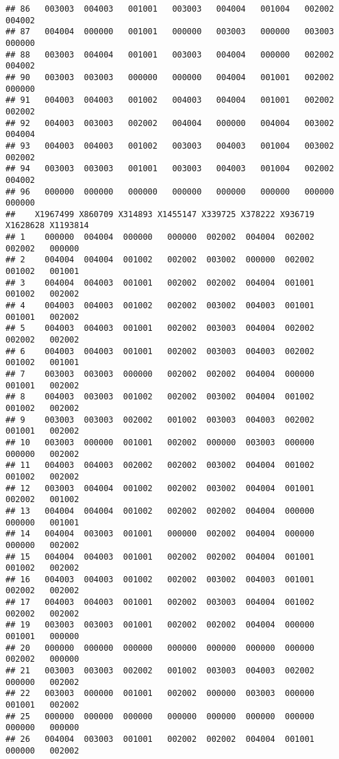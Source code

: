 \documentclass[
]{article}
\begin{document}
\begin{verbatim}
## 86   003003  004003   001001   003003   004004   001004   002002   004002
## 87   004004  000000   001001   000000   003003   000000   003003   000000
## 88   003003  004004   001001   003003   004004   000000   002002   004002
## 90   003003  003003   000000   000000   004004   001001   002002   000000
## 91   004003  004003   001002   004003   004004   001001   002002   002002
## 92   004003  003003   002002   004004   000000   004004   003002   004004
## 93   004003  004003   001002   003003   004003   001004   003002   002002
## 94   003003  003003   001001   003003   004003   001004   002002   004002
## 96   000000  000000   000000   000000   000000   000000   000000   000000
##    X1967499 X860709 X314893 X1455147 X339725 X378222 X936719 X1628628 X1193814
## 1    000000  004004  000000   000000  002002  004004  002002   002002   000000
## 2    004004  004004  001002   002002  003002  000000  002002   001002   001001
## 3    004004  004003  001001   002002  002002  004004  001001   001002   002002
## 4    004003  004003  001002   002002  003002  004003  001001   001001   002002
## 5    004003  004003  001001   002002  003003  004004  002002   002002   002002
## 6    004003  004003  001001   002002  003003  004003  002002   001002   001001
## 7    003003  003003  000000   002002  002002  004004  000000   001001   002002
## 8    004003  003003  001002   002002  003002  004004  001002   001002   002002
## 9    003003  003003  002002   001002  003003  004003  002002   001001   002002
## 10   003003  000000  001001   002002  000000  003003  000000   000000   002002
## 11   004003  004003  002002   002002  003002  004004  001002   001002   002002
## 12   003003  004004  001002   002002  003002  004004  001001   002002   001002
## 13   004004  004004  001002   002002  002002  004004  000000   000000   001001
## 14   004004  003003  001001   000000  002002  004004  000000   000000   002002
## 15   004004  004003  001001   002002  002002  004004  001001   001002   002002
## 16   004003  004003  001002   002002  003002  004003  001001   002002   002002
## 17   004003  004003  001001   002002  003003  004004  001002   002002   002002
## 19   003003  003003  001001   002002  002002  004004  000000   001001   000000
## 20   000000  000000  000000   000000  000000  000000  000000   002002   000000
## 21   003003  003003  002002   001002  003003  004003  002002   000000   002002
## 22   003003  000000  001001   002002  000000  003003  000000   001001   002002
## 25   000000  000000  000000   000000  000000  000000  000000   000000   000000
## 26   004004  003003  001001   002002  002002  004004  001001   000000   002002

\end{verbatim}
\end{document}
